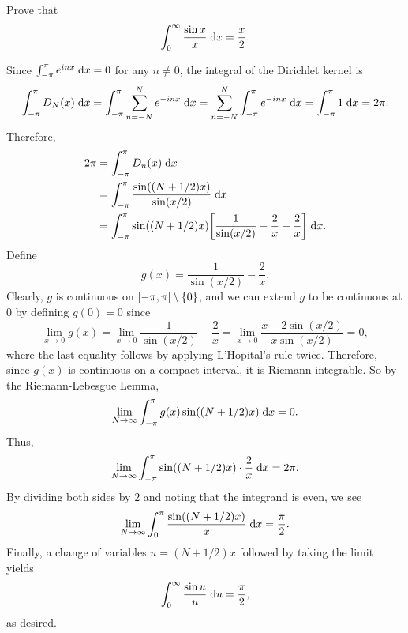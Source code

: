 \begin{exrc}[12]
    Prove that
    \begin{equation*}
        \int_{0}^{\infty} \frac{\sin x}{x} \;\mathrm d x = \frac{x}{2}.
    \end{equation*}

\begin{soln}
    Since \(\int_{-\pi}^{\pi} e^{inx} \;\mathrm d x = 0\) for any \(n \neq 0\),
    the integral of the Dirichlet kernel is
    \begin{equation*}
        \int_{-\pi}^{\pi} D_N(x) \;\mathrm d x
        = \int_{-\pi}^{\pi} \sum_{n = -N}^{N} e^{-inx} \;\mathrm d x
        = \sum_{n = -N}^{N} \int_{-\pi}^{\pi} e^{-inx} \;\mathrm d x
        = \int_{-\pi}^{\pi} 1 \;\mathrm d x
        = 2\pi.
    \end{equation*}
    Therefore,
    \begin{align*}
        2\pi
        &= \int_{-\pi}^{\pi} D_n(x) \ud x \\
        &= \int_{-\pi}^{\pi} \frac{\sin((N + 1 / 2)x)}{\sin(x / 2)} \ud x \\
        &= \int_{-\pi}^{\pi} \sin\br{(N + 1/2)x} \sqbr{\frac{1}{\sin(x/2)}
        - \frac{2}{x} + \frac{2}{x}} \ud x.
    \end{align*}
    Define
    \begin{equation*}
        g(x) = \frac{1}{\sin(x / 2)} - \frac{2}{x}.
    \end{equation*}
    Clearly, \(g\) is continuous on \([-\pi, \pi] \setminus \set{0}\),
    and we can extend \(g\) to be continuous at 0 by defining \(g(0) = 0\) since
    \begin{equation*}
        \lim_{x \to 0} g(x)
        = \lim_{x \to 0} \frac{1}{\sin(x / 2)} - \frac{2}{x}
        = \lim_{x \to 0} \frac{x - 2\sin(x / 2)}{x \sin(x / 2)}
        = 0,
    \end{equation*}
    where the last equality follows by applying L'Hopital's rule twice.
    Therefore, since \(g(x)\) is continuous on a compact interval, it is Riemann integrable.
    So by the Riemann-Lebesgue Lemma,
    \begin{equation*}
        \lim_{N \to \infty} \int_{-\pi}^{\pi} g(x) \sin((N + 1 / 2)x) \;\mathrm d x = 0.
    \end{equation*}
    Thus,
    \begin{equation*}
        \lim_{N \to \infty} \int_{-\pi}^{\pi} \sin((N + 1/2)x) \cdot \frac{2}{x} \;\mathrm d x = 2\pi.
    \end{equation*}
    By dividing both sides by \(2\) and noting that the integrand is even, we see
    \begin{equation*}
        \lim_{N \to \infty} \int_{0}^{\pi} \frac{\sin((N + 1/2)x)}{x} \;\mathrm d x = \frac{\pi}{2}.
    \end{equation*}
    Finally, a change of variables \(u = (N + 1/2)x\) followed by taking the limit yields
    \begin{equation*}
        \int_{0}^{\infty} \frac{\sin u}{u} \;\mathrm d u = \frac{\pi}{2},
    \end{equation*}
    as desired.


\end{soln}
\end{exrc}
